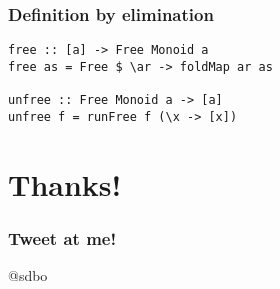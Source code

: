 \documentclass[pdf]{beamer}
\begin{document}
\begin{frame}[fragile]
  \frametitle{Definition by elimination}
\begin{lstlisting}
free :: [a] -> Free Monoid a
free as = Free $ \ar -> foldMap ar as

unfree :: Free Monoid a -> [a]
unfree f = runFree f (\x -> [x])
\end{lstlisting}
\end{frame}

\section{Thanks!}

\begin{frame}
  \frametitle{Tweet at me!}
  \begin{center}
    @sdbo
  \end{center}
\end{frame}
\end{document}
